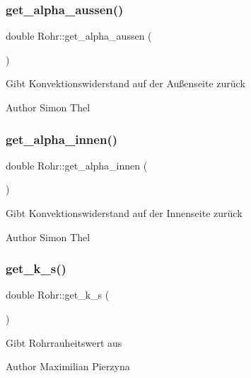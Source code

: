 \subsubsection{\texorpdfstring{get\+\_\+alpha\+\_\+aussen()}{get\_alpha\_aussen()}}
{\footnotesize\ttfamily double Rohr\+::get\+\_\+alpha\+\_\+aussen (\begin{DoxyParamCaption}{ }\end{DoxyParamCaption})}

Gibt Konvektionswiderstand auf der Außenseite zurück \begin{DoxyAuthor}{Author}
Simon Thel 
\end{DoxyAuthor}
\mbox{\label{class_rohr_a8e5ea4e3595b344475e2db45deccd9fd}} 
\subsubsection{\texorpdfstring{get\+\_\+alpha\+\_\+innen()}{get\_alpha\_innen()}}
{\footnotesize\ttfamily double Rohr\+::get\+\_\+alpha\+\_\+innen (\begin{DoxyParamCaption}{ }\end{DoxyParamCaption})}

Gibt Konvektionswiderstand auf der Innenseite zurück \begin{DoxyAuthor}{Author}
Simon Thel 
\end{DoxyAuthor}
\mbox{\label{class_rohr_a653e53a000dd4ed025d1adbdb83f7859}} 
\subsubsection{\texorpdfstring{get\+\_\+k\+\_\+s()}{get\_k\_s()}}
{\footnotesize\ttfamily double Rohr\+::get\+\_\+k\+\_\+s (\begin{DoxyParamCaption}{ }\end{DoxyParamCaption})}

Gibt Rohrrauheitswert aus \begin{DoxyAuthor}{Author}
Maximilian Pierzyna 
\end{DoxyAuthor}
\mbox{\label{class_rohr_a29a212b5ffe5723b3c2fe02aba0804c0}} 
